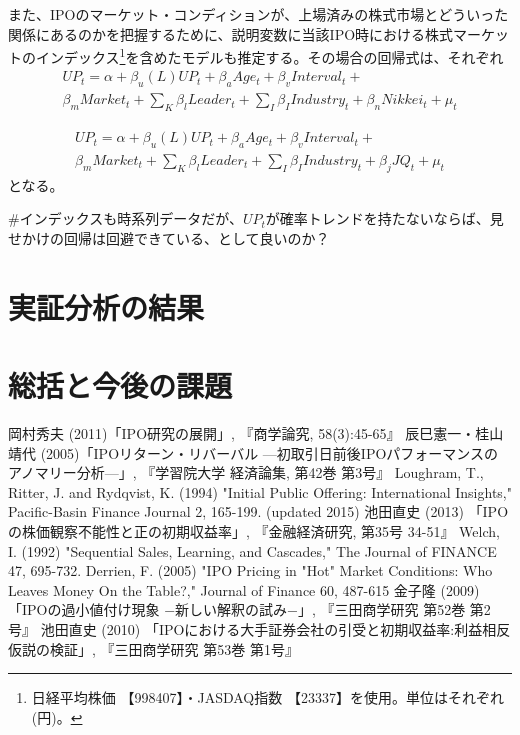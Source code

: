 \documentclass{jsarticle}
\begin{document}
また、IPOのマーケット・コンディションが、上場済みの株式市場とどういった関係にあるのかを把握するために、説明変数に当該IPO時における株式マーケットのインデックス\footnote[10]{日経平均株価 【998407】・JASDAQ指数 【23337】を使用。単位はそれぞれ(円)。}を含めたモデルも推定する。その場合の回帰式は、それぞれ
\begin{equation}
\begin{split}
	UP_t = \alpha + \beta_u (L) UP_t + \beta_a Age_t + \beta_v Interval_t + \\
	 \beta_m Market_t + \sum_{K} \beta_l Leader_t +  \sum_{I} \beta_I Industry_t + \beta_n Nikkei_t+  \mu_t
\end{split}
\end{equation}

\begin{equation}
\begin{split}
	UP_t = \alpha + \beta_u (L) UP_t + \beta_a Age_t + \beta_v Interval_t + \\
	 \beta_m Market_t + \sum_{K} \beta_l Leader_t +  \sum_{I} \beta_I Industry_t + \beta_j JQ_t+  \mu_t
\end{split}
\end{equation}
となる。\par
\#インデックスも時系列データだが、$UP_t$が確率トレンドを持たないならば、見せかけの回帰は回避できている、として良いのか？\par

\newpage


\section{実証分析の結果}
\section{総括と今後の課題}

\newpage


\begin{thebibliography}{99}
 岡村秀夫 (2011)「IPO研究の展開」, 『商学論究, 58(3):45-65』
 辰巳憲一・桂山靖代 (2005)「IPOリターン・リバーバル —初取引日前後IPOパフォーマンスのアノマリー分析—」, 『学習院大学 経済論集, 第42巻 第3号』
 Loughram, T., Ritter, J. and Rydqvist, K. (1994) "Initial Public Offering: International Insights," Pacific-Basin Finance Journal 2, 165-199. (updated 2015)
 池田直史 (2013) 「IPOの株価観察不能性と正の初期収益率」, 『金融経済研究, 第35号 34-51』
 Welch, I. (1992) "Sequential Sales, Learning, and Cascades," The Journal of FINANCE 47, 695-732.
 Derrien, F. (2005) "IPO Pricing in "Hot" Market Conditions: Who Leaves Money On the Table?," Journal of Finance 60, 487-615
 金子隆 (2009) 「IPOの過小値付け現象 −新しい解釈の試み−」, 『三田商学研究 第52巻 第2号』
 池田直史 (2010) 「IPOにおける大手証券会社の引受と初期収益率:利益相反仮説の検証」, 『三田商学研究 第53巻 第1号』
\end{thebibliography}
\end{document}
